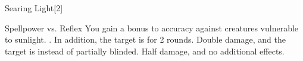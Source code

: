 \begin{spellsection}{Searing Light}[2]
    \begin{spellheader}
    \end{spellheader}
    \begin{spellcontent}
        \begin{spelltargetinginfo}
        \end{spelltargetinginfo}
        \begin{spelleffects}
            \begin{spellattack}{Spellpower vs. Reflex}
                \spellspecial You gain a  bonus to accuracy against creatures vulnerable to sunlight.
                \spellsuccess {}. In addition, the target is \partiallyblinded for 2 rounds.
                \spellcritical Double damage, and the target is \blinded instead of partially blinded.
                \spellfailure Half damage, and no additional effects.
            \end{spellattack}
        \end{spelleffects}
    \end{spellcontent}
    \begin{spellfooter}
        \miscastrandom
    \end{spellfooter}
    \begin{spellaugments}
    \end{spellaugments}
\end{spellsection}

